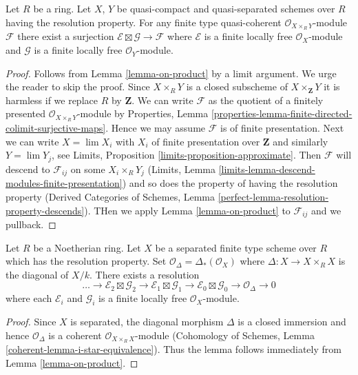 \begin{lemma}
\label{lemma-on-product-general}
Let $R$ be a ring. Let $X$, $Y$ be quasi-compact and quasi-separated
schemes over $R$ having the resolution property. For any finite
type quasi-coherent $\mathcal{O}_{X \times_R Y}$-module $\mathcal{F}$
there exist a surjection $\mathcal{E} \boxtimes \mathcal{G} \to \mathcal{F}$
where $\mathcal{E}$ is a finite locally free $\mathcal{O}_X$-module
and $\mathcal{G}$ is a finite locally free $\mathcal{O}_Y$-module.
\end{lemma}

\begin{proof}
Follows from Lemma \ref{lemma-on-product} by a limit argument.
We urge the reader to skip the proof.
Since $X \times_R Y$ is a closed subscheme of $X \times_\mathbf{Z} Y$
it is harmless if we replace $R$ by $\mathbf{Z}$.
We can write $\mathcal{F}$ as the quotient of
a finitely presented $\mathcal{O}_{X \times_R Y}$-module by
Properties, Lemma
\ref{properties-lemma-finite-directed-colimit-surjective-maps}.
Hence we may assume $\mathcal{F}$ is of
finite presentation. Next we can write $X = \lim X_i$
with $X_i$ of finite presentation over $\mathbf{Z}$ and similarly
$Y = \lim Y_j$, see Limits, Proposition \ref{limits-proposition-approximate}.
Then $\mathcal{F}$ will descend to $\mathcal{F}_{ij}$ on some $X_i \times_R Y_j$
(Limits, Lemma \ref{limits-lemma-descend-modules-finite-presentation}) and
so does the property of having the resolution property
(Derived Categories of Schemes, Lemma
\ref{perfect-lemma-resolution-property-descends}).
THen we apply Lemma \ref{lemma-on-product}
to $\mathcal{F}_{ij}$ and we pullback.
\end{proof}

\begin{lemma}
\label{lemma-diagonal-resolution}
Let $R$ be a Noetherian ring. Let $X$ be a separated finite type scheme
over $R$ which has the resolution property. Set
$\mathcal{O}_\Delta = \Delta_*(\mathcal{O}_X)$ where
$\Delta : X \to X \times_R X$ is the diagonal of $X/k$.
There exists a resolution
$$
\ldots \to
\mathcal{E}_2 \boxtimes \mathcal{G}_2 \to
\mathcal{E}_1 \boxtimes \mathcal{G}_1 \to
\mathcal{E}_0 \boxtimes \mathcal{G}_0 \to
\mathcal{O}_\Delta \to 0
$$
where each $\mathcal{E}_i$ and $\mathcal{G}_i$ is a finite locally
free $\mathcal{O}_X$-module.
\end{lemma}

\begin{proof}
Since $X$ is separated, the diagonal morphism $\Delta$ is a closed
immersion and hence $\mathcal{O}_\Delta$ is a coherent
$\mathcal{O}_{X \times_R X}$-module (Cohomology of Schemes, Lemma
\ref{coherent-lemma-i-star-equivalence}).
Thus the lemma follows immediately from Lemma \ref{lemma-on-product}.
\end{proof}

